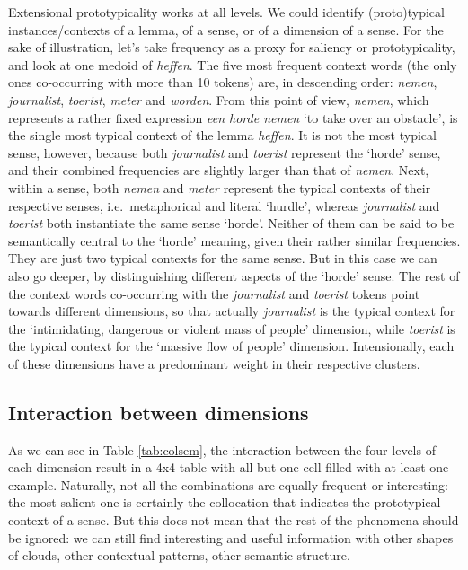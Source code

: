\documentclass[
]{book}
\begin{document}
Extensional prototypicality works at all levels. We could identify (proto)typical instances/contexts of a lemma, of a sense, or of a dimension of a sense. For the sake of illustration, let's take frequency as a proxy for saliency or prototypicality, and look at one medoid of \emph{heffen}. The five most frequent context words (the only ones co-occurring with more than 10 tokens) are, in descending order: \emph{nemen}, \emph{journalist}, \emph{toerist}, \emph{meter} and \emph{worden}. From this point of view, \emph{nemen}, which represents a rather fixed expression \emph{een horde nemen} `to take over an obstacle', is the single most typical context of the lemma \emph{heffen}. It is not the most typical sense, however, because both \emph{journalist} and \emph{toerist} represent the `horde' sense, and their combined frequencies are slightly larger than that of \emph{nemen}. Next, within a sense, both \emph{nemen} and \emph{meter} represent the typical contexts of their respective senses, i.e.~metaphorical and literal `hurdle', whereas \emph{journalist} and \emph{toerist} both instantiate the same sense `horde'. Neither of them can be said to be semantically central to the `horde' meaning, given their rather similar frequencies. They are just two typical contexts for the same sense. But in this case we can also go deeper, by distinguishing different aspects of the `horde' sense. The rest of the context words co-occurring with the \emph{journalist} and \emph{toerist} tokens point towards different dimensions, so that actually \emph{journalist} is the typical context for the `intimidating, dangerous or violent mass of people' dimension, while \emph{toerist} is the typical context for the `massive flow of people' dimension. Intensionally, each of these dimensions have a predominant weight in their respective clusters.

\hypertarget{interaction-between-dimensions}{%
\subsection{Interaction between dimensions}\label{interaction-between-dimensions}}

As we can see in Table \ref{tab:colsem}, the interaction between the four levels of each dimension result in a 4x4 table with all but one cell filled with at least one example. Naturally, not all the combinations are equally frequent or interesting: the most salient one is certainly the collocation that indicates the prototypical context of a sense. But this does not mean that the rest of the phenomena should be ignored: we can still find interesting and useful information with other shapes of clouds, other contextual patterns, other semantic structure.
\end{document}
